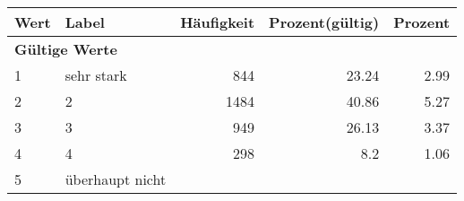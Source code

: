      \begin{longtable}{lXrrr}
     \toprule
     \textbf{Wert} & \textbf{Label} & \textbf{Häufigkeit} & \textbf{Prozent(gültig)} & \textbf{Prozent} \\
     \endhead
     \midrule
     \multicolumn{5}{l}{\textbf{Gültige Werte}}\\

     1 &
     \multicolumn{1}{X}{ sehr stark   } &


       \num{844} &
       \num[round-mode=places,round-precision=2]{23.24} &
         \num[round-mode=places,round-precision=2]{2.99} \\

     2 &
     \multicolumn{1}{X}{ 2   } &


       \num{1484} &
       \num[round-mode=places,round-precision=2]{40.86} &
         \num[round-mode=places,round-precision=2]{5.27} \\

     3 &
     \multicolumn{1}{X}{ 3   } &


       \num{949} &
       \num[round-mode=places,round-precision=2]{26.13} &
         \num[round-mode=places,round-precision=2]{3.37} \\

     4 &
     \multicolumn{1}{X}{ 4   } &


       \num{298} &
       \num[round-mode=places,round-precision=2]{8.2} &
         \num[round-mode=places,round-precision=2]{1.06} \\

     5 &
     \multicolumn{1}{X}{ überhaupt nicht   } &



\end{longtable}
